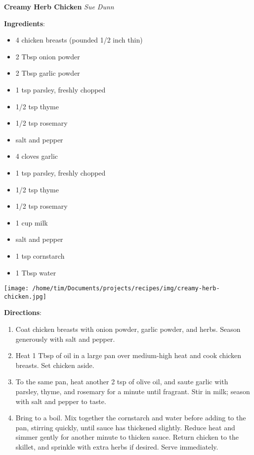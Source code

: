 \documentclass[11pt, twoside, openany]{book}
\begin{document}
\noindent\begin{minipage}[t]{\linewidth}%
{\Large\textbf{Creamy Herb Chicken}} \label{creamy-herb-chicken}\hfill\textit{Sue Dunn}\\
\noindent\begin{minipage}[t]{0.78\linewidth}%
\textbf{Ingredients}:\vspace{-3mm}
\begin{multicols}{2}
\begin{itemize}\setlength\itemsep{-1mm}
\item 4 chicken breasts (pounded 1/2 inch thin)
\item 2 Tbsp onion powder
\item 2 Tbsp garlic powder
\item 1 tsp parsley, freshly chopped
\item 1/2 tsp thyme
\item 1/2 tsp rosemary
\item salt and pepper
\item 4 cloves garlic
\item 1 tsp parsley, freshly chopped
\item 1/2 tsp thyme
\item 1/2 tsp rosemary
\item 1 cup milk
\item salt and pepper
\item 1 tsp cornstarch
\item 1 Tbsp water
\end{itemize}
\end{multicols}
\end{minipage}
\noindent\begin{minipage}[t]{0.18\linewidth}
\centering \strut\vspace*{-\baselineskip}\newline
\texttt{[image: /home/tim/Documents/projects/recipes/img/creamy-herb-chicken.jpg]}\\
\end{minipage}\vspace{3mm}
\textbf{Directions}:
\vspace{-3mm}\begin{enumerate}\setlength\itemsep{-1mm}
\item Coat chicken breasts with onion powder, garlic powder, and herbs. Season generously with salt and pepper.
\item Heat 1 Tbsp of oil in a large pan over medium-high heat and cook chicken breasts. Set chicken aside.
\item To the same pan, heat another 2 tsp of olive oil, and saute garlic with parsley, thyme, and rosemary for a minute until fragrant. Stir in milk; season with salt and pepper to taste.
\item Bring to a boil. Mix together the cornstarch and water before adding to the pan, stirring quickly, until sauce has thickened slightly. Reduce heat and simmer gently for another minute to thicken sauce. Return chicken to the skillet, and sprinkle with extra herbs if desired. Serve immediately.
\end{enumerate}
\end{minipage}\vspace{8mm}
\end{document}

